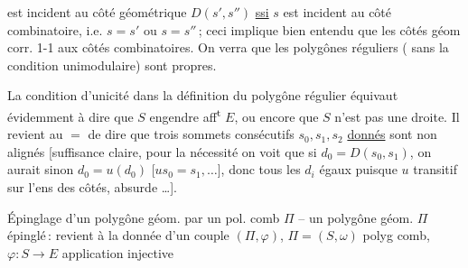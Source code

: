 est incident au côté géométrique $D(s',s'')$
\uline{ssi} $s$ est incident au côté combinatoire, i.e.
$s=s'$ ou $s=s''$\,; ceci implique bien entendu
que les côtés géom corr. 1-1 aux côtés
combinatoires. On verra que les polygônes
réguliers ( sans la condition unimodulaire)
sont  propres.

La condition d'unicité dans la définition
du polygône régulier équivaut évidemment
à dire que $S$ engendre aff\textsuperscript{t} $E$, ou encore
que $S$ n'est pas   une droite. Il
revient au $=$  de dire que
trois sommets consécutifs $s_0,s_1,s_2$ \uline{donnés}
sont non alignés [suffisance claire, pour la
nécessité on voit que si $d_0=D(s_0,s_1)$, on aurait
sinon  $d_0=u(d_0)$ [$us_0=s_1,\ldots$], donc
tous les $d_i$ égaux puisque $u$ transitif
sur l'ens des côtés, absurde \ldots].

Épinglage d'un polygône géom. par
un pol. comb $\Pi$ -- un polygône
géom. $\Pi$ épinglé\,: revient à la donnée
d'un couple  $(\Pi,\varphi)$, $\Pi=(S,\omega)$
polyg comb, $\varphi:S\longrightarrow E$ application injective

